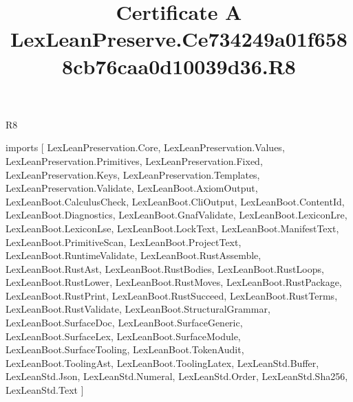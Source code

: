 \begin{lexlean}{R8}
\title{Certificate A LexLeanPreserve.Ce734249a01f6588cb76caa0d10039d36.R8}
\begin{coremodule}
imports [
  LexLeanPreservation.Core,
  LexLeanPreservation.Values,
  LexLeanPreservation.Primitives,
  LexLeanPreservation.Fixed,
  LexLeanPreservation.Keys,
  LexLeanPreservation.Templates,
  LexLeanPreservation.Validate,
  LexLeanBoot.AxiomOutput,
  LexLeanBoot.CalculusCheck,
  LexLeanBoot.CliOutput,
  LexLeanBoot.ContentId,
  LexLeanBoot.Diagnostics,
  LexLeanBoot.GnafValidate,
  LexLeanBoot.LexiconLre,
  LexLeanBoot.LexiconLse,
  LexLeanBoot.LockText,
  LexLeanBoot.ManifestText,
  LexLeanBoot.PrimitiveScan,
  LexLeanBoot.ProjectText,
  LexLeanBoot.RuntimeValidate,
  LexLeanBoot.RustAssemble,
  LexLeanBoot.RustAst,
  LexLeanBoot.RustBodies,
  LexLeanBoot.RustLoops,
  LexLeanBoot.RustLower,
  LexLeanBoot.RustMoves,
  LexLeanBoot.RustPackage,
  LexLeanBoot.RustPrint,
  LexLeanBoot.RustSucceed,
  LexLeanBoot.RustTerms,
  LexLeanBoot.RustValidate,
  LexLeanBoot.StructuralGrammar,
  LexLeanBoot.SurfaceDoc,
  LexLeanBoot.SurfaceGeneric,
  LexLeanBoot.SurfaceLex,
  LexLeanBoot.SurfaceModule,
  LexLeanBoot.SurfaceTooling,
  LexLeanBoot.TokenAudit,
  LexLeanBoot.ToolingAst,
  LexLeanBoot.ToolingLatex,
  LexLeanStd.Buffer,
  LexLeanStd.Json,
  LexLeanStd.Numeral,
  LexLeanStd.Order,
  LexLeanStd.Sha256,
  LexLeanStd.Text
]


\end{coremodule}
\end{lexlean}
